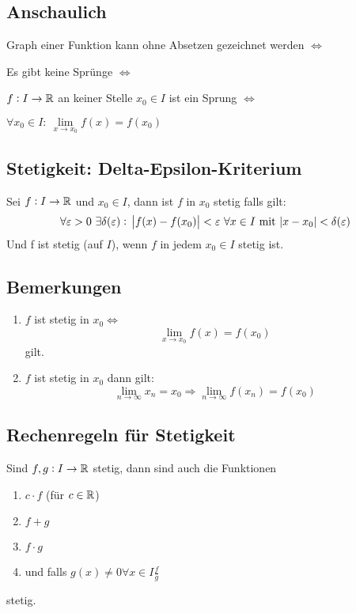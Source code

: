 \subsection{Anschaulich}
Graph einer Funktion kann ohne Absetzen gezeichnet werden $\Leftrightarrow$

Es gibt keine Sprünge $\Leftrightarrow$

$f: I \rightarrow \mathbb{R}$ an keiner Stelle $x_0 \in I$ ist ein Sprung $\Leftrightarrow$

$\forall x_0 \in I:\ \lim\limits_{x \rightarrow x_0} f(x) = f(x_0)$


\subsection{Stetigkeit: Delta-Epsilon-Kriterium}
Sei $f: I \rightarrow \mathbb{R}$ und $x_0 \in I$, dann ist $f$ in $x_0$ stetig
falls gilt:
\begin{equation*}
    \forall \varepsilon > 0\ \exists \delta(\varepsilon):\
    \abs{f(x)-f(x_0)}<\varepsilon\ \forall x \in I \text{ mit }
    \abs{x-x_0}<\delta(\varepsilon)
\end{equation*}
Und f ist stetig (auf $I$), wenn $f$ in jedem $x_0 \in I$ stetig ist.

\subsection{Bemerkungen}
\begin{enumerate}[label= (\alph*)]
    \item $f$ ist stetig in $x_0 \Leftrightarrow$
        \begin{equation*}
            \lim_{x \rightarrow x_0} f(x) = f(x_0)
        \end{equation*}
        gilt.
    \item $f$ ist stetig in $x_0$ dann gilt:
        \begin{equation*}
            \lim_{n \rightarrow \infty} x_n = x_0 \Rightarrow
            \lim_{n \rightarrow \infty} f(x_n) = f(x_0)
        \end{equation*}
\end{enumerate}

\subsection{Rechenregeln für Stetigkeit}
Sind $f,g: I \rightarrow \mathbb{R}$ stetig, dann sind auch die Funktionen
\begin{enumerate}[label= (\alph*)]
    \item $c \cdot f$ (für $c \in \mathbb{R}$)
    \item $f + g$
    \item $f \cdot g$
    \item und falls $g(x) \neq 0 \forall x \in I \frac{f}{g}$
\end{enumerate}
stetig.

